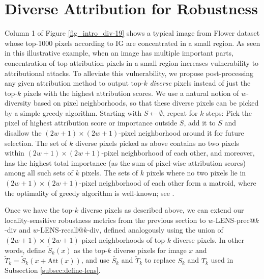 \documentclass[letterpaper]{article} %
\begin{document}
\section{Diverse Attribution for Robustness} \label{sec:div-lens} 
Column 1 of Figure \ref{fig_intro_div-19} shows a typical  image from Flower dataset whose top-1000 pixels according to IG are concentrated in a small region. As seen in this illustrative example, when an image has multiple important parts, concentration of top attribution pixels in a small region increases vulnerability to attributional attacks. To alleviate this vulnerability, we propose post-processing any given attribution method to output top-$k$ \emph{diverse} pixels instead of just the top-$k$ pixels with the highest attribution scores. We use a natural notion of $w$-diversity based on pixel neighborhoods, so that these diverse pixels can be picked by a simple greedy algorithm. Starting with $S \leftarrow \emptyset$, repeat for $k$ steps: Pick the pixel of highest attribution score or importance outside $S$, add it to $S$ and disallow the $(2w+1) \times (2w+1)$-pixel neighborhood around it for future selection. The set of $k$ diverse pixels picked as above contains no two pixels within $(2w+1) \times (2w+1)$-pixel neighborhood of each other, and moreover, has the highest total importance (as the sum of pixel-wise attribution scores) among all such sets of $k$ pixels. The sets of $k$ pixels where no two pixels lie in $(2w+1) \times (2w+1)$-pixel neighborhood of each other form a matroid, where the optimality of greedy algorithm is well-known; see \citet{KorteLovasz1981}. 

Once we have the top-$k$ diverse pixels as described above, we can extend our locality-sensitive robustness metrics from the previous section to $w$-LENS-prec@$k$-div and $w$-LENS-recall@$k$-div, defined analogously using the union of $(2w+1) \times (2w+1)$-pixel neighborhoods of top-$k$ diverse pixels. In other words, define $\tilde{S}_{k}(x)$ as the top-$k$ diverse pixels for image $x$ and $\tilde{T}_{k} = \tilde{S}_{k}(x  + \text{Att}(x))$, and use $\tilde{S_{k}}$ and $\tilde{T}_{k}$ to replace $S_{k}$ and $T_{k}$ used in Subsection \ref{subsec:define-lens}. 
\end{document}

